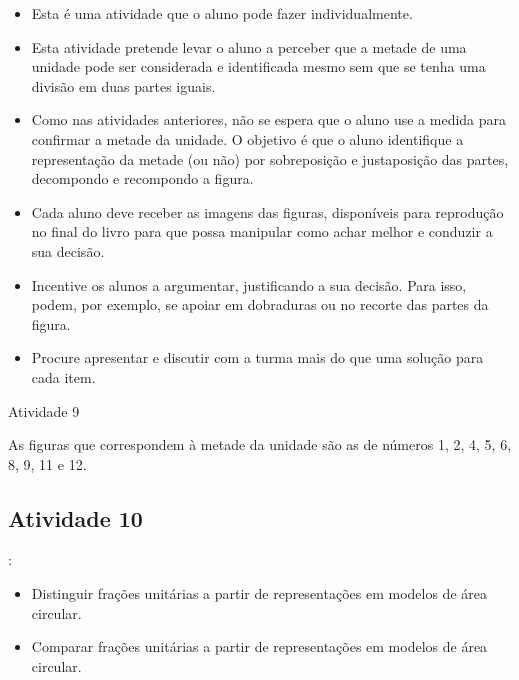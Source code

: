 \begin{multicols}{2}
  \begin{itemize} %
    \item       Esta é uma atividade que o aluno pode fazer individualmente.
    \item       Esta atividade pretende levar o aluno a perceber que a metade de uma unidade pode ser considerada e identificada mesmo sem que se tenha uma divisão em duas partes iguais.
    \item       Como nas atividades anteriores, não se espera que o aluno use a medida para confirmar a metade da unidade. O objetivo é que o aluno identifique a representação da metade (ou não) por sobreposição e justaposição das partes, decompondo e recompondo a figura.
    \item       Cada aluno deve receber as imagens das figuras, disponíveis para reprodução no final do livro para que possa manipular como achar melhor e conduzir a sua decisão.
    \item       Incentive os alunos a argumentar, justificando a sua decisão. Para isso, podem, por exemplo, se apoiar em dobraduras ou no recorte das partes da figura.
    \item       Procure apresentar e discutir com a turma mais do que uma solução para cada item.
\end{itemize} %

\begin{resposta*}{Atividade 9}

  As figuras que correspondem à metade da unidade são as de números 1, 2, 4, 5, 6, 8, 9, 11 e 12.
\end{resposta*}

\subsection{Atividade 10}

:
\begin{itemize}
 \item Distinguir frações unitárias a partir de representações em modelos de área circular.
\item     Comparar frações unitárias a partir de representações em modelos de área circular.
\end{itemize}

 \vspace{.1cm}
 
 \vspace{.1cm}


\end{multicols}
